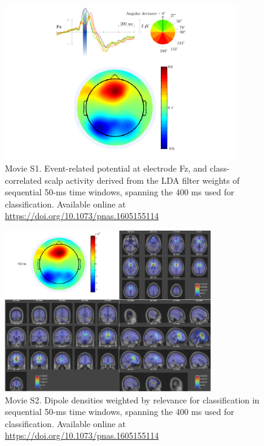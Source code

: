 \begin{figure}[t]
    \renewcommand\thefigure{\ref{chapter:nat}.M1}
    \centering
    \includegraphics[width=0.9\textwidth]{figures/nat-app-movie-s1-still.png}
    \caption[Movie S1. Event-related potential at electrode Fz, and class-correlated scalp activity derived from the LDA filter weights of sequential 50-ms time windows,
spanning the 400 ms used for classification.]{Movie S1. Event-related potential at electrode Fz, and class-correlated scalp activity derived from the LDA filter weights of sequential 50-ms time windows,
spanning the 400 ms used for classification. Available online at \href{https://doi.org/10.1073/pnas.1605155114}{https://doi.org/10.1073/pnas.1605155114}}
\end{figure}

\begin{figure}[b]
    \renewcommand\thefigure{\ref{chapter:nat}.M2}
    \centering
    \includegraphics[width=0.8\textwidth]{figures/nat-app-movie-s2-still.png}
    \caption[Movie S2. Dipole densities weighted by relevance for classification in sequential 50-ms time windows, spanning the 400 ms used for classification.]{Movie S2. Dipole densities weighted by relevance for classification in sequential 50-ms time windows, spanning the 400 ms used for classification. Available online at \href{https://doi.org/10.1073/pnas.1605155114}{https://doi.org/10.1073/pnas.1605155114}}
\end{figure}

